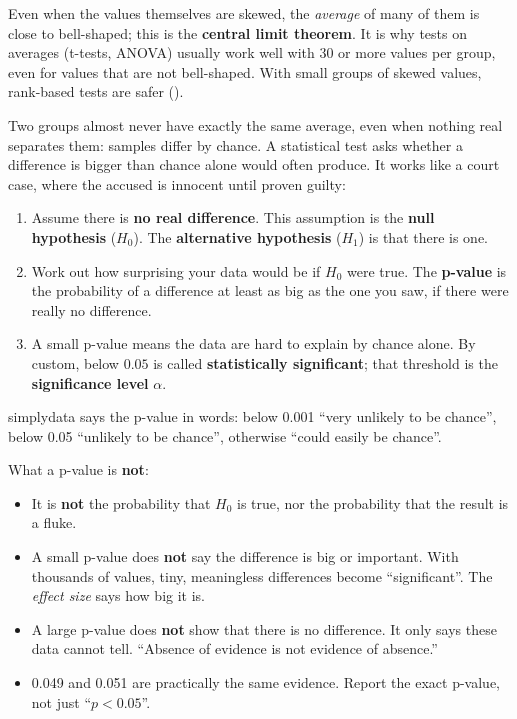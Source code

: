 
Even when the values themselves are skewed, the \emph{average} of many of them is close to
bell-shaped; this is the \textbf{central limit theorem}. It is why tests on averages (t-tests,
ANOVA) usually work well with 30 or more values per group, even for values that are not
bell-shaped. With small groups of skewed values, rank-based tests are safer
().



Two groups almost never have exactly the same average, even when nothing real separates them:
samples differ by chance. A statistical test asks whether a difference is bigger than chance alone
would often produce. It works like a court case, where the accused is innocent until proven
guilty:

\begin{enumerate}
  \item Assume there is \textbf{no real difference}. This assumption is the \textbf{null
    hypothesis} ($H_0$). The \textbf{alternative hypothesis} ($H_1$) is that there is one.
  \item Work out how surprising your data would be if $H_0$ were true. The \textbf{p-value} is the
    probability of a difference at least as big as the one you saw, if there were really no
    difference.
  \item A small p-value means the data are hard to explain by chance alone. By custom, below
    $0.05$ is called \textbf{statistically significant}; that threshold is the
    \textbf{significance level} $\alpha$.
\end{enumerate}

simplydata says the p-value in words: below 0.001 ``very unlikely to be chance'', below 0.05
``unlikely to be chance'', otherwise ``could easily be chance''.

\begin{goodtoknow}
What a p-value is \textbf{not}:
\begin{itemize}
  \item It is \textbf{not} the probability that $H_0$ is true, nor the probability that the result
    is a fluke.
  \item A small p-value does \textbf{not} say the difference is big or important. With thousands
    of values, tiny, meaningless differences become ``significant''. The \emph{effect size} says
    how big it is.
  \item A large p-value does \textbf{not} show that there is no difference. It only says these
    data cannot tell. ``Absence of evidence is not evidence of absence.''
  \item 0.049 and 0.051 are practically the same evidence. Report the exact p-value, not just
    ``$p < 0.05$''.
\end{itemize}
\end{goodtoknow}

